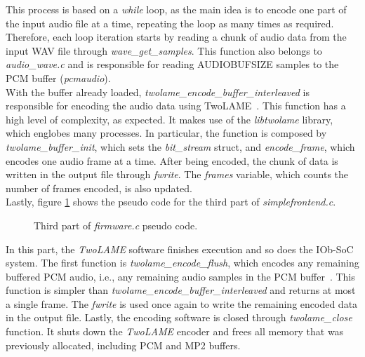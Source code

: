 This process is based on a \textit{while} loop, as the main idea is to encode one part of the input audio file at a time, repeating the loop as many times as required. Therefore, each loop iteration starts by reading a chunk of audio data from the input WAV file through \textit{wave\_get\_samples}. This function also belongs to \textit{audio\_wave.c} and is responsible for reading AUDIOBUFSIZE samples to the PCM buffer (\textit{pcmaudio}).\\
With the buffer already loaded, \textit{twolame\_encode\_buffer\_interleaved} is responsible for encoding the audio data using TwoLAME~\cite{twolameapi}. This function has a high level of complexity, as expected. It makes use of the \textit{libtwolame} library, which englobes many processes. In particular, the function is composed by \textit{twolame\_buffer\_init}, which sets the \textit{bit\_stream} struct, and \textit{encode\_frame}, which encodes one audio frame at a time.
After being encoded, the chunk of data is written in the output file through \textit{fwrite}. The \textit{frames} variable, which counts the number of frames encoded, is also updated. \\

Lastly, figure \ref{pseudo3} shows the pseudo code for the third part of \textit{simplefrontend.c}. 

\begin{figure}[H]
\centerline{}
\caption{Third part of \textit{firmware.c} pseudo code.}
\label{pseudo3}
\end{figure}


In this part, the \textit{TwoLAME} software finishes execution and so does the IOb-SoC system.
The first function is \textit{twolame\_encode\_flush}, which encodes any remaining buffered PCM audio, i.e., any remaining audio samples in the PCM buffer~\cite{twolameapi}. This function is simpler than \textit{twolame\_encode\_buffer\_interleaved} and returns at most a single frame.
The \textit{fwrite} is used once again to write the remaining encoded data in the output file. Lastly, the encoding software is closed through \textit{twolame\_close} function. It shuts down the \textit{TwoLAME} encoder and frees all memory that was previously allocated, including PCM and MP2 buffers.


